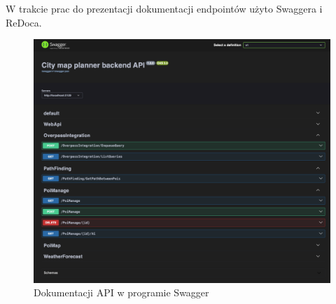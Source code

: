 W trakcie prac do prezentacji dokumentacji endpointów użyto Swaggera i ReDoca.

\begin{figure}[H]
\centering
\includegraphics[width=1\textwidth]{attachments/swagger}
\caption{Dokumentacji API w programie Swagger}
\label{fig:figure}
\end{figure}

